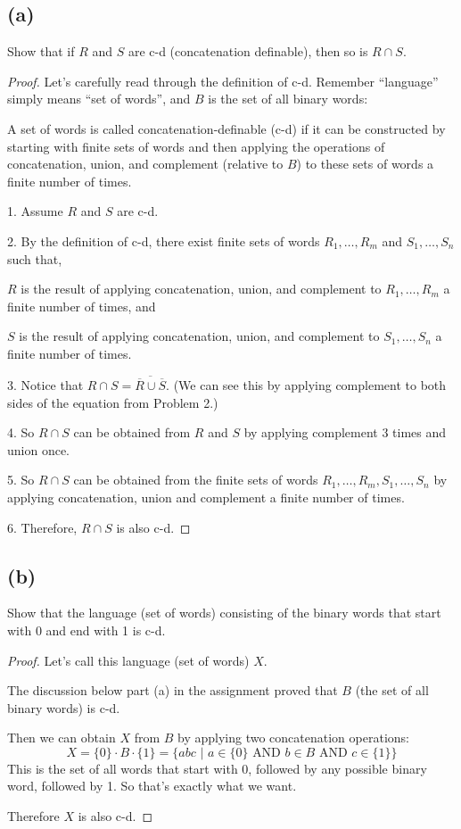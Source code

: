 \documentclass[14pt]{extarticle}
\begin{document}
\subsection{(a)}
Show that if $R$ and $S$ are c-d (concatenation definable), then so is $R \cap S$.
\begin{proof}
Let's carefully read through the definition of c-d. Remember ``language'' simply means ``set of words'', and $B$ is the set of all binary words:

A set of words is called concatenation-definable (c-d) if it can be constructed by starting with finite sets of words and then applying the operations of concatenation, union, and complement (relative to $B$) to these sets of words a finite number of times.

1. Assume $R$ and $S$ are c-d.

2. By the definition of c-d, there exist finite sets of words $R_1, \ldots, R_m$ and $S_1, \ldots, S_n$ such that, 

$R$ is the result of applying concatenation, union, and complement to $R_1, \ldots, R_m$ a finite number of times, and

$S$ is the result of applying concatenation, union, and complement to $S_1, \ldots, S_n$ a finite number of times.

3. Notice that $R \cap S = \overline{\overline{R} \cup \overline{S}}$. (We can see this by applying complement to both sides of the equation from Problem 2.)

4. So $R \cap S$ can be obtained from $R$ and $S$ by applying complement 3 times and union once.

5. So $R \cap S$ can be obtained from the finite sets of words $R_1, \ldots, R_m, S_1, \ldots, S_n$ by applying concatenation, union and complement a finite number of times.

6. Therefore, $R \cap S$ is also c-d.
\end{proof}

\subsection{(b)}
Show that the language (set of words) consisting of the binary words that start with 0 and end with 1 is c-d.
\begin{proof}
Let's call this language (set of words) $X$.

The discussion below part (a) in the assignment proved that $B$ (the set of all binary words) is c-d.

Then we can obtain $X$ from $B$ by applying two concatenation operations: 
$$
X = \{0\} \cdot B \cdot \{1\} = \{abc \,\,|\,\, a \in \{0\} \text{ AND } b \in B \text{ AND } c \in \{1\}\}
$$ 
This is the set of all words that start with 0, followed by any possible binary word, followed by 1. So that's exactly what we want.

Therefore $X$ is also c-d.
\end{proof}
\end{document}
